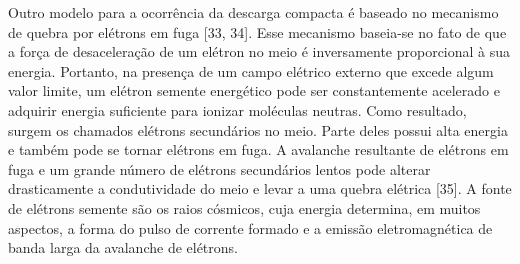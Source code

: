 \documentclass[a4paper, 12pt, onecolumn,singlespacing]{article}
\begin{document}
	Outro modelo para a ocorrência da descarga compacta é baseado no mecanismo de quebra por elétrons em fuga [33, 34]. Esse mecanismo baseia-se no fato de que a força de desaceleração de um elétron no meio é inversamente proporcional à sua energia. Portanto, na presença de um campo elétrico externo que excede algum valor limite, um elétron semente energético pode ser constantemente acelerado e adquirir energia suficiente para ionizar moléculas neutras. Como resultado, surgem os chamados elétrons secundários no meio. Parte deles possui alta energia e também pode se tornar elétrons em fuga. A avalanche resultante de elétrons em fuga e um grande número de elétrons secundários lentos pode alterar drasticamente a condutividade do meio e levar a uma quebra elétrica [35]. A fonte de elétrons semente são os raios cósmicos, cuja energia determina, em muitos aspectos, a forma do pulso de corrente formado e a emissão eletromagnética de banda larga da avalanche de elétrons.
	
	
	
\end{document}
